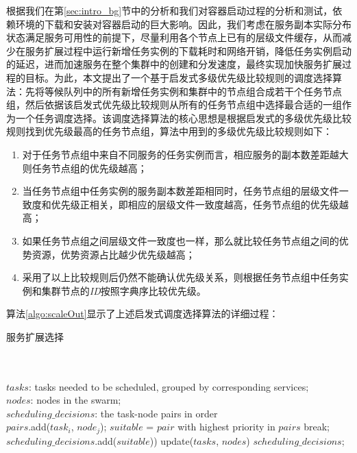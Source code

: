 根据我们在第\ref{sec:intro_bg}节中的分析和我们对容器启动过程的分析和测试，依赖环境的下载和安装对容器启动的巨大影响。因此，我们考虑在服务副本实际分布状态满足服务可用性的前提下，尽量利用各个节点上已有的层级文件缓存，从而减少在服务扩展过程中运行新增任务实例的下载耗时和网络开销，降低任务实例启动的延迟，进而加速服务在整个集群中的创建和分发速度，最终实现加快服务扩展过程的目标。为此，本文提出了一个基于启发式多级优先级比较规则的调度选择算法：先将等候队列中的所有新增任务实例和集群中的节点组合成若干个任务节点组，然后依据该启发式优先级比较规则从所有的任务节点组中选择最合适的一组作为一个任务调度选择。该调度选择算法的核心思想是根据启发式的多级优先级比较规则找到优先级最高的任务节点组，算法中用到的多级优先级比较规则如下：
\begin{enumerate}
\item 对于任务节点组中来自不同服务的任务实例而言，相应服务的副本数差距越大则任务节点组的优先级越高；
\item 当任务节点组中任务实例的服务副本数差距相同时，任务节点组的层级文件一致度和优先级正相关，即相应的层级文件一致度越高，任务节点组的优先级越高；
\item 如果任务节点组之间层级文件一致度也一样，那么就比较任务节点组之间的优势资源，优势资源占比越少优先级越高；
\item 采用了以上比较规则后仍然不能确认优先级关系，则根据任务节点组中任务实例和集群节点的\emph{ID}按照字典序比较优先级。
\end{enumerate}

算法\ref{algo:scaleOut}显示了上述启发式调度选择算法的详细过程：
\begin{algorithm}[H]
\caption{服务扩展选择}
\label{algo:scaleOut}
\begin{algorithmic}[0]
\\
\Require ~~\
\\
$tasks$: tasks needed to be scheduled, grouped by corresponding services;\\
$nodes$: nodes in the swarm;
\Ensure ~~\
\\
$scheduling\_decisions$: the task-node pairs in order \\

                \State $pairs$.add($task_{i}$, $node_{j}$);
            \EndIf
        \EndFor
    \EndFor
    \State $suitable$ = ${pair}$ with highest priority in ${pairs}$
        \State break;
    \EndIf
    \State $scheduling\_decisions$.add($suitable$))  
    \State update($tasks$, $nodes$)
\EndWhile
\State \Return $scheduling\_decisions$;
\end{algorithmic}
\end{algorithm}

